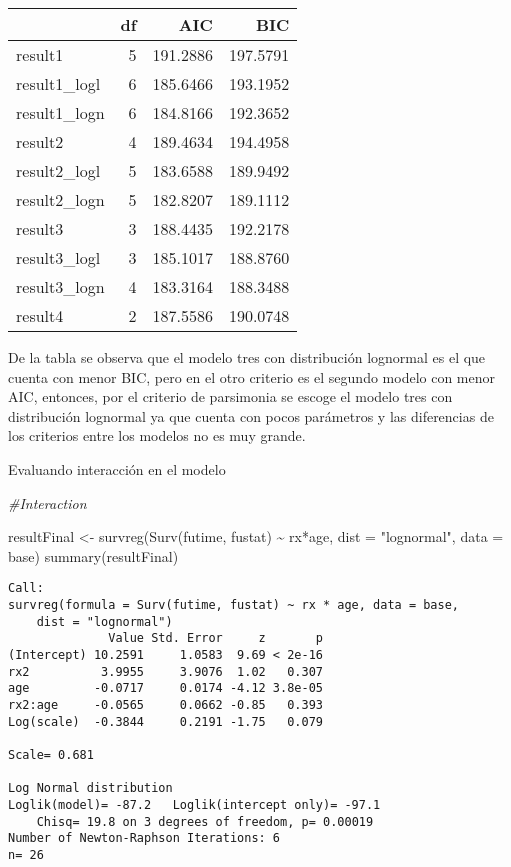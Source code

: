 \documentclass[
]{article}
\newenvironment{Shaded}{\begin{snugshade}}{\end{snugshade}}
\newcommand{\AttributeTok}[1]{\textcolor[rgb]{0.77,0.63,0.00}{#1}}
\newcommand{\CommentTok}[1]{\textcolor[rgb]{0.56,0.35,0.01}{\textit{#1}}}
\newcommand{\FunctionTok}[1]{\textcolor[rgb]{0.00,0.00,0.00}{#1}}
\newcommand{\NormalTok}[1]{#1}
\newcommand{\OtherTok}[1]{\textcolor[rgb]{0.56,0.35,0.01}{#1}}
\newcommand{\SpecialCharTok}[1]{\textcolor[rgb]{0.00,0.00,0.00}{#1}}
\newcommand{\StringTok}[1]{\textcolor[rgb]{0.31,0.60,0.02}{#1}}
\begin{document}
\begin{table}
\centering
\begin{tabular}{l|r|r|r}
\hline
  & df & AIC & BIC\\
\hline
result1 & 5 & 191.2886 & 197.5791\\
\hline
result1\_logl & 6 & 185.6466 & 193.1952\\
\hline
result1\_logn & 6 & 184.8166 & 192.3652\\
\hline
result2 & 4 & 189.4634 & 194.4958\\
\hline
result2\_logl & 5 & 183.6588 & 189.9492\\
\hline
result2\_logn & 5 & 182.8207 & 189.1112\\
\hline
result3 & 3 & 188.4435 & 192.2178\\
\hline
result3\_logl & 3 & 185.1017 & 188.8760\\
\hline
result3\_logn & 4 & 183.3164 & 188.3488\\
\hline
result4 & 2 & 187.5586 & 190.0748\\
\hline
\end{tabular}
\end{table}

De la tabla se observa que el modelo tres con distribución lognormal es
el que cuenta con menor BIC, pero en el otro criterio es el segundo
modelo con menor AIC, entonces, por el criterio de parsimonia se escoge
el modelo tres con distribución lognormal ya que cuenta con pocos
parámetros y las diferencias de los criterios entre los modelos no es
muy grande.

Evaluando interacción en el modelo

\begin{Shaded}
\begin{Highlighting}[]
\CommentTok{\#Interaction}

\NormalTok{resultFinal }\OtherTok{\textless{}{-}} \FunctionTok{survreg}\NormalTok{(}\FunctionTok{Surv}\NormalTok{(futime, fustat) }\SpecialCharTok{\textasciitilde{}}\NormalTok{ rx}\SpecialCharTok{*}\NormalTok{age, }\AttributeTok{dist =} \StringTok{"lognormal"}\NormalTok{, }\AttributeTok{data =}\NormalTok{ base)}
\FunctionTok{summary}\NormalTok{(resultFinal)}
\end{Highlighting}
\end{Shaded}

\begin{verbatim}
Call:
survreg(formula = Surv(futime, fustat) ~ rx * age, data = base, 
    dist = "lognormal")
              Value Std. Error     z       p
(Intercept) 10.2591     1.0583  9.69 < 2e-16
rx2          3.9955     3.9076  1.02   0.307
age         -0.0717     0.0174 -4.12 3.8e-05
rx2:age     -0.0565     0.0662 -0.85   0.393
Log(scale)  -0.3844     0.2191 -1.75   0.079

Scale= 0.681 

Log Normal distribution
Loglik(model)= -87.2   Loglik(intercept only)= -97.1
    Chisq= 19.8 on 3 degrees of freedom, p= 0.00019 
Number of Newton-Raphson Iterations: 6 
n= 26 
\end{verbatim}
\end{document}
